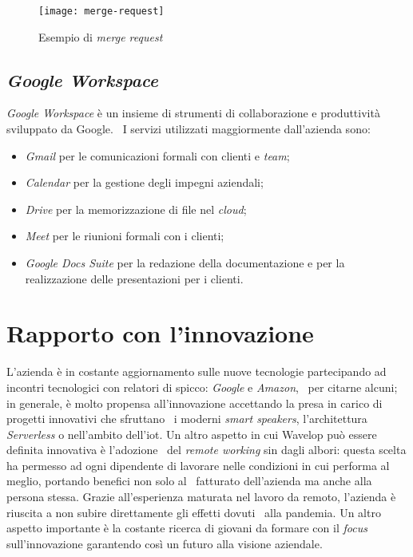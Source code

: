 \begin{figure}[!ht]
  \begin{center}
    \texttt{[image: merge-request]}
    \caption{Esempio di \emph{merge request}}
  \end{center}
\end{figure}

\newpage
\subsection{\emph{Google Workspace}}
\emph{Google Workspace} è un insieme di strumenti di collaborazione e produttività sviluppato da Google. \
I servizi utilizzati maggiormente dall'azienda sono:

\begin{itemize}
  \item \emph{Gmail} per le comunicazioni formali con clienti e \emph{team};
  \item \emph{Calendar} per la gestione degli impegni aziendali;
  \item \emph{Drive} per la memorizzazione di file nel \emph{cloud};
  \item \emph{Meet} per le riunioni formali con i clienti;
  \item \emph{Google Docs Suite} per la redazione della documentazione e per la realizzazione delle presentazioni per i clienti.
\end{itemize}

\section{Rapporto con l'innovazione}
L'azienda è in costante aggiornamento sulle nuove tecnologie partecipando ad incontri tecnologici con relatori di spicco: \emph{Google} e \emph{Amazon}, \
per citarne alcuni; in generale, è molto propensa all'innovazione accettando la presa in carico di progetti innovativi che sfruttano \
i moderni \emph{smart speakers}, l'architettura \emph{Serverless} o nell'ambito dell'\acrfull{iot}. Un altro aspetto in cui Wavelop può essere definita innovativa è l'adozione \
del \emph{remote working} sin dagli albori: questa scelta ha permesso ad ogni dipendente di lavorare nelle condizioni in cui performa al meglio, portando benefici non solo al \
fatturato dell'azienda ma anche alla persona stessa. Grazie all'esperienza maturata nel lavoro da remoto, l'azienda è riuscita a non subire direttamente gli effetti dovuti \
alla pandemia. Un altro aspetto importante è la costante ricerca di giovani da formare con il \emph{focus} sull'innovazione garantendo così un futuro alla visione aziendale.